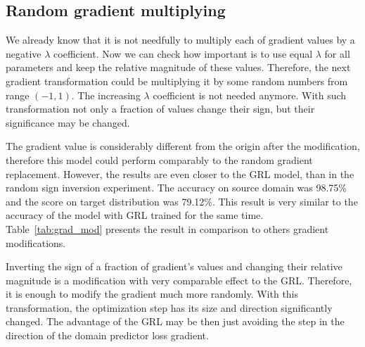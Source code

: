 \documentclass[shortabstract, inz, english]{iithesis}
\begin{document}
\subsection{Random gradient multiplying}
We already know that it is not needfully to multiply each of gradient values by a negative $\lambda$ coefficient. Now we can check how important is to use equal $\lambda$ for all parameters and keep the relative magnitude of these values. Therefore, the next gradient transformation could be multiplying it by some random numbers from range $(-1, 1)$. The increasing $\lambda$ coefficient is not needed anymore. With such transformation not only a fraction of values change their sign, but their significance may be changed. 
\par
The gradient value is considerably different from the origin after the modification, therefore this model could perform comparably to the random gradient replacement. However, the results are even closer to the GRL model, than in the random sign inversion experiment. The accuracy on source domain was 98.75\% and the score on target distribution was 79.12\%. This result is very similar to the accuracy of the model with GRL trained for the same time. Table~\ref{tab:grad_mod} presents the result in comparison to others gradient modifications.
\par
Inverting the sign of a fraction of gradient's values and changing their relative magnitude is a modification with very comparable effect to the GRL. Therefore, it is enough to modify the gradient much more randomly. With this transformation, the optimization step has its size and direction significantly changed. The advantage of the GRL may be then just avoiding the step in the direction of the domain predictor loss gradient.
\end{document}
